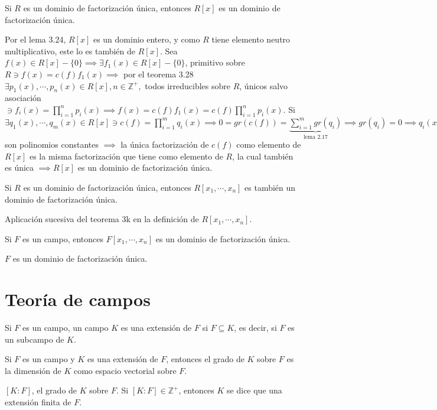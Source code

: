 \begin{teorema}[3K]
    Si $R$ es un dominio de factorización única, entonces $R[x]$ es un dominio de factorización única. 
    \begin{dem}
        Por el lema 3.24, $R[x]$ es un dominio entero, y como $R$ tiene elemento neutro multiplicativo, este lo es también de $R[x]$. Sea $f(x)\in R[x]-\{0\}\implies \exists f_1(x)\in R[x]-\{0\}$, primitivo sobre $R\ni f(x)=c(f)f_1(x)\implies$ por el teorema 3.28 $\exists p_1(x),\cdots, p_n(x)\in R[x],n\in\mathbb{Z}^+,$ todos irreducibles sobre $R$, únicos salvo asociación $\ni f_i(x)=\prod_{i=1}^n p_i(x)\implies f(x)=c(f)f_1(x)=c(f)\prod_{i=1}^np_i(x)$. Si $\exists q_1(x),\cdots, q_m(x)\in R[x]\ni c(f)=\prod_{i=1}^m q_i(x)\implies 0=gr(c(f))=\underbrace{\sum_{i=1}^m gr(q_i)}_{\text{lema 2.17}}\implies gr(q_i)=0\implies q_i(x)$ son polinomios constantes $\implies$ la única factorización de $c(f)$ como elemento de $R[x]$ es la misma factorización que tiene como elemento de $R$, la cual también es única $\implies R[x]$ es un dominio de factorización única.
    \end{dem}
\end{teorema}

\begin{corolario}
    Si $R$ es un dominio de factorización única, entonces $R[x_1,\cdots,x_n]$ es también un dominio de factorización única. 
    \begin{dem}
        Aplicación sucesiva del teorema 3k en la definición de $R[x_1,\cdots,x_n]$.
    \end{dem}
\end{corolario}

\begin{corolario}
    Si $F$ es un campo, entonces $F[x_1,\cdots,x_n]$ es un dominio de factorización única. 
    \begin{dem}
        $F$ es un dominio de factorización única. 
    \end{dem}
\end{corolario}


\section{Teoría de campos}
\begin{definicion}
    Si $F$ es un campo, un campo $K$ es una extensión de $F$ si $F\subseteq K$, es decir, si $F$ es un subcampo de $K$.
\end{definicion}

\begin{definicion}
    Si $F$ es un campo y $K$ es una extensión de $F$, entonces el grado de $K$ sobre $F$ es la dimensión de $K$ como espacio vectorial sobre $F$. 
    \begin{cajita}
        $[K:F]$, el grado de $K$ sobre $F$. Si $[K:F]\in\mathbb{Z}^+$, entonces $K$ se dice que una extensión finita de $F$.  
    \end{cajita}
\end{definicion}

